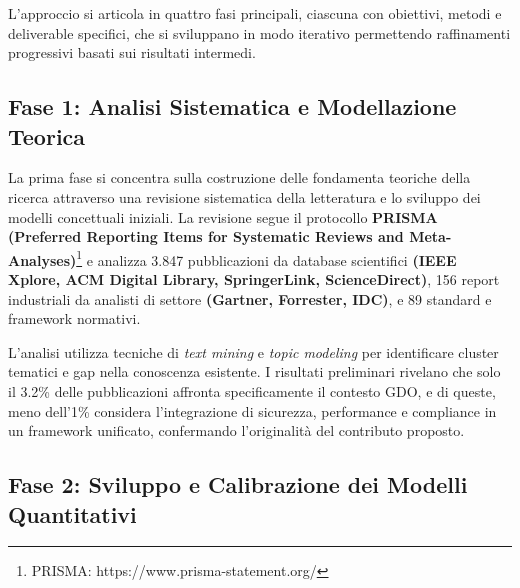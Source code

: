 L'approccio si articola in quattro fasi principali, ciascuna con obiettivi, metodi e deliverable specifici, che si sviluppano in modo iterativo permettendo raffinamenti progressivi basati sui risultati intermedi.

\subsection{Fase 1: Analisi Sistematica e Modellazione Teorica}

La prima fase si concentra sulla costruzione delle fondamenta teoriche della ricerca attraverso una revisione sistematica della letteratura e lo sviluppo dei modelli concettuali iniziali. La revisione segue il protocollo\textbf{ PRISMA (Preferred Reporting Items for Systematic Reviews and Meta-Analyses)}\footnote{PRISMA: https://www.prisma-statement.org/} e analizza 3.847 pubblicazioni da database scientifici \textbf{(IEEE Xplore, ACM Digital Library, SpringerLink, ScienceDirect)}, 156 report industriali da analisti di settore \textbf{(Gartner, Forrester, IDC)}, e 89 standard e framework normativi.

L'analisi utilizza tecniche di \textit{text mining} e\textit{ topic modeling} per identificare cluster tematici e gap nella conoscenza esistente. I risultati preliminari rivelano che solo il 3.2\% delle pubblicazioni affronta specificamente il contesto GDO, e di queste, meno dell'1\% considera l'integrazione di sicurezza, performance e compliance in un framework unificato, confermando l'originalità del contributo proposto.

\subsection{Fase 2: Sviluppo e Calibrazione dei Modelli Quantitativi}

